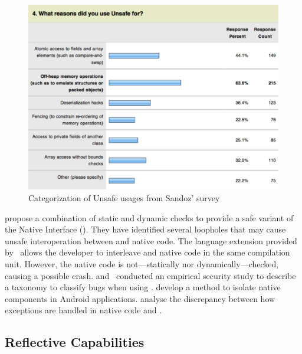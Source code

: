 \begin{figure}[ht!]
\centering
\includegraphics[width=\textwidth]{Unsafe-Survey-4}
\caption{Categorization of Unsafe usages from Sandoz' survey} \label{fig:lr:unsafe4}
\end{figure}

\cite{tanSafeJavaNative2006} propose a combination of static and dynamic checks to provide a safe variant of the \java{} Native Interface (\jni{}).
They have identified several loopholes that may cause unsafe interoperation between \java{} and native code.
The language extension provided by~\cite{Bubak00creatingjava}
allows the developer to interleave \java{} and native code in the same compilation unit.
However, the native code is not---statically nor dynamically---checked,
causing a possible \jvm{} crash.
\cite{tanEmpiricalSecurityStudy2008} and~\cite{kondohFindingBugsJava2008}
conducted an empirical security study to describe a taxonomy to classify bugs when using \jni{}.
\cite{sunNativeGuardProtectingAndroid2014} develop a method to isolate native components in Android applications.
\cite{liFindingBugsExceptional2009} analyse the discrepancy between how exceptions are handled in native code and \java{}.

\subsection{Reflective Capabilities}
\label{sec:literature-review:casting}

